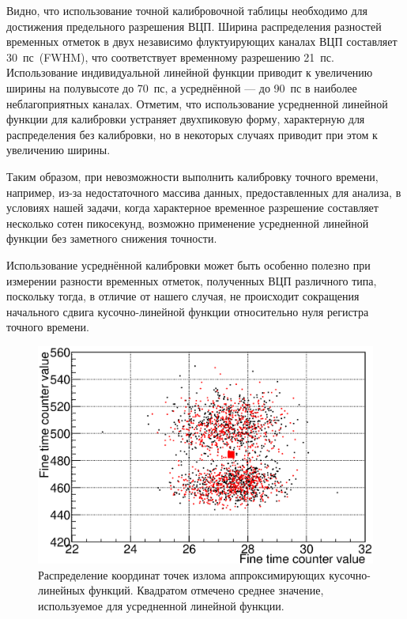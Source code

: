 Видно, что использование точной калибровочной таблицы необходимо для достижения предельного разрешения ВЦП. Ширина распределения разностей временных отметок в двух независимо флуктуирующих каналах ВЦП составляет 30~пс~(FWHM), что соответствует временному разрешению 21~пс. Использование индивидуальной линейной функции приводит к увеличению ширины на полувысоте до 70~пс, а усреднённой --- до 90~пс в наиболее неблагоприятных каналах. Отметим, что использование усредненной линейной функции для калибровки устраняет двухпиковую форму, характерную для распределения без калибровки, но в некоторых случаях приводит при этом к увеличению ширины.

Таким образом, при невозможности выполнить калибровку точного времени, например, из-за недостаточного массива данных, предоставленных для анализа, в условиях нашей задачи, когда характерное временное разрешение составляет несколько сотен пикосекунд, возможно применение усредненной линейной функции без заметного снижения точности.

Использование усреднённой калибровки может быть особенно полезно при измерении разности временных отметок, полученных ВЦП различного типа, поскольку тогда, в отличие от нашего случая, не происходит сокращения начального сдвига кусочно-линейной функции относительно нуля регистра точного времени.

\begin{figure}[H]
\centering
\includegraphics[width=1.0\textwidth]{pictures/19_ABmap.eps}
\caption{Распределение координат точек излома аппроксимирующих кусочно-линейных функций. Квадратом отмечено среднее значение, используемое для усредненной линейной функции.}
\label{fig:ABmap}
\end{figure}

